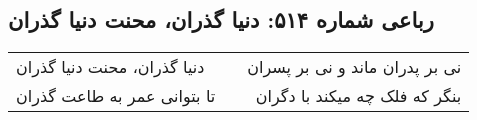 \begin{center}
\section*{رباعی شماره ۵۱۴: دنیا گذران، محنت دنیا گذران}
\label{sec:sh514}
\begin{longtable}{l p{0.5cm} r}
دنیا گذران، محنت دنیا گذران
&&
نی بر پدران ماند و نی بر پسران
\\
تا بتوانی عمر به طاعت گذران
&&
بنگر که فلک چه میکند با دگران
\\
\end{longtable}
\end{center}
